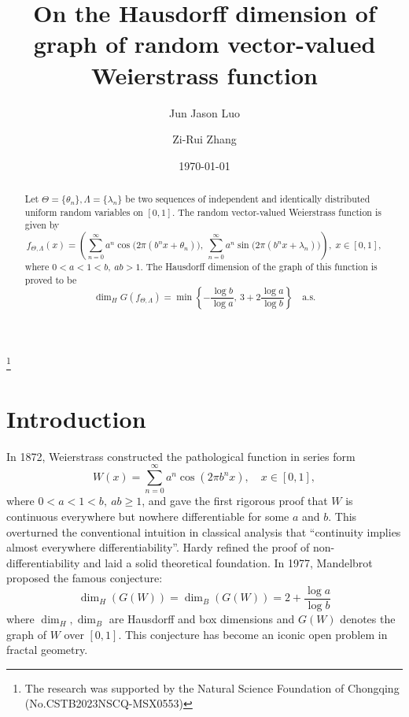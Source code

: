 \documentclass[12pt, reqno]{amsart}
\theoremstyle{plain}
\theoremstyle{definition}
\theoremstyle{remark}
\begin{document}
	
\title{On the Hausdorff dimension of graph of random vector-valued Weierstrass function}

\author{Jun Jason Luo}  \address{College of Mathematics and Statistics,  Chongqing University, Chongqing, 401331, P.R. China} 


\author{Zi-Rui Zhang}  \address{College of Mathematics and Statistics,  Chongqing University, Chongqing, 401331, P.R. China} 


\begin{abstract}
		Let $\Theta=\{\theta_n\}, \Lambda=\{\lambda_n\}$ be two sequences of independent and identically distributed uniform random variables on $[0,1]$. The  random vector-valued Weierstrass function is given by
		$$
		f_{\Theta,\Lambda}(x)=
		\left(
		\sum_{n=0}^{\infty} a^n\cos\bigl(2\pi (b^n x+\theta_n)\bigr),\ 
		\sum_{n=0}^{\infty} a^n\sin\bigl(2\pi (b^n x+\lambda_n)\bigr)
		\right), \;  x\in[0,1],
		$$ where $0<a<1<b,\ ab> 1$. The Hausdorff dimension of the graph of this function is proved to be
	$$\dim_H G(f_{\Theta,\Lambda}) = \min\left\{-\frac{\log b}{\log a}, \, 3 +2\frac{\log a}{\log b}\right\} \quad \text{a.s.}$$
\end{abstract}

	\date{\today}
	
	
	
	\thanks{The research was supported by the Natural Science Foundation of Chongqing (No.CSTB2023NSCQ-MSX0553)}
	
	
	\maketitle
	
	\section{Introduction}
	
In 1872, Weierstrass \cite{Weierstrass1872} constructed the pathological function in series form
\begin{equation}\label{w-cos function}
	W(x)=\sum_{n=0}^\infty a^n\cos(2\pi b^n x),\quad x\in [0,1],
\end{equation}
where $0<a<1<b,\ ab\ge 1$, and gave the first rigorous proof that $W$ is continuous everywhere but nowhere differentiable for some $a$ and $b$. This overturned the conventional intuition in classical analysis that ``continuity implies almost everywhere differentiability''. Hardy \cite{Hardy1916} refined the proof of non-differentiability and laid a solid theoretical foundation. In 1977, Mandelbrot \cite{Mandelbrot1977} proposed the famous conjecture:
\[
\dim_H(G(W))=\dim_B(G(W))=2+\frac{\log a}{\log b}
\] where $\dim_H, \dim_B$ are Hausdorff and box dimensions and $G(W)$ denotes the graph of $W$ over $[0,1]$. This conjecture has become an iconic open problem in fractal geometry.
\end{document}
